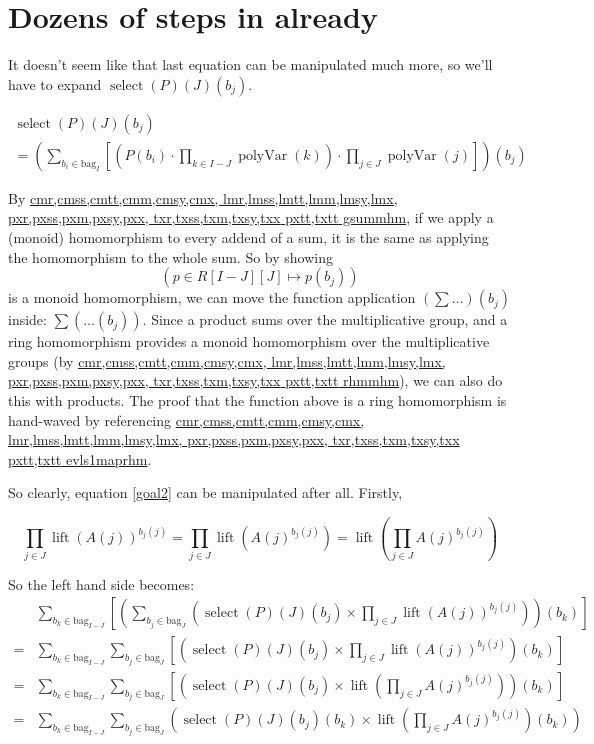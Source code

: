 \documentclass[]{article}
\makeatletter
\DeclareMathOperator{\select}{select}
\DeclareMathOperator{\polyVar}{polyVar}
\DeclareMathOperator{\lift}{lift}
\newcommand{\bag}[1]{\mathrm{bag}_{#1}}
\newcommand{\theoremlink}[1]{\href{https://us.metamath.org/mpeuni/#1.html}{\midtilde{} #1}}
\newcommand\midtilde@raisedtilde[1][.5]{\raisebox{#1ex}{\texttildelow}}
\def\midtilde@normaltilde{\texttildelow}
\newcommand\midtilde%
{%
  \expandafter\in@\expandafter{\f@family}%
    {cmr,cmss,cmtt,cmm,cmsy,cmx,%
    lmr,lmss,lmtt,lmm,lmsy,lmx,%
    pxr,pxss,pxm,pxsy,pxx,%
    txr,txss,txm,txsy,txx}%
  \ifin@%
    \midtilde@raisedtilde%
  \else%
    \expandafter\in@\expandafter{\f@family}%
    {pxtt,txtt}%
    \ifin@%
      \midtilde@raisedtilde[.35]%
    \else%
      \midtilde@normaltilde%
    \fi%
  \fi%
}
\makeatother
\begin{document}
\section{Dozens of steps in already}

It doesn't seem like that last equation can be manipulated much more, so we'll have to expand $\select(P)(J)(b_j)$.

\begin{equation*}
\begin{split}
  \select(P)(J)(b_j) \\ = \left(\sum_{b_i \in \bag{I}} \left[\left(P(b_i) \cdot
                                           \prod_{k \in I-J}\polyVar(k)\right) \cdot
                                           \prod_{j \in J}\polyVar(j)\right]\right)(b_j)
\end{split}
\end{equation*}

By \theoremlink{gsummhm}, if we apply a (monoid) homomorphism to every addend of a sum, it is the same as applying the homomorphism to the whole sum. So by showing \[ ( p \in R[I-J][J] \mapsto p(b_j) ) \] is a monoid homomorphism, we can move the function application $(\sum \dots)(b_j)$ inside: $\sum (\dots (b_j))$. Since a product sums over the multiplicative group, and a ring homomorphism provides a monoid homomorphism over the multiplicative groups (by \theoremlink{rhmmhm}), we can also do this with products. The proof that the function above is a ring homomorphism is hand-waved by referencing \theoremlink{evls1maprhm}.

So clearly, equation \ref{goal2} can be manipulated after all. Firstly,

\[
  \prod_{j \in J}{\lift\left(A(j)\right)^{b_j(j)}}
  = \prod_{j \in J}\lift\left(A(j)^{b_j(j)}\right)
  = \lift\left(\prod_{j \in J}A(j)^{b_j(j)}\right)
\]

So the left hand side becomes:
\begin{align*}
    &\sum_{b_k \in \bag{I-J}} \left[\left(\sum_{b_j \in \bag{J}} \left(
       \select(P)(J)(b_j)
     \times \prod_{j \in J}{\lift\left(A(j)\right)^{b_j(j)}}\right) \right)(b_k)\right] \\
  = &\sum_{b_k \in \bag{I-J}} \sum_{b_j \in \bag{J}} \left[\left(
       \select(P)(J)(b_j)
     \times \prod_{j \in J}{\lift\left(A(j)\right)^{b_j(j)}} \right)(b_k)\right] \\
  = &\sum_{b_k \in \bag{I-J}} \sum_{b_j \in \bag{J}} \left[\left(
       \select(P)(J)(b_j)
     \times \lift\left(\prod_{j \in J}A(j)^{b_j(j)}\right) \right)(b_k)\right] \\
  = &\sum_{b_k \in \bag{I-J}} \sum_{b_j \in \bag{J}} \left(
       \select(P)(J)(b_j)(b_k)
     \times \lift\left(\prod_{j \in J}A(j)^{b_j(j)}\right)(b_k) \right) \\
\end{align*}
\end{document}
